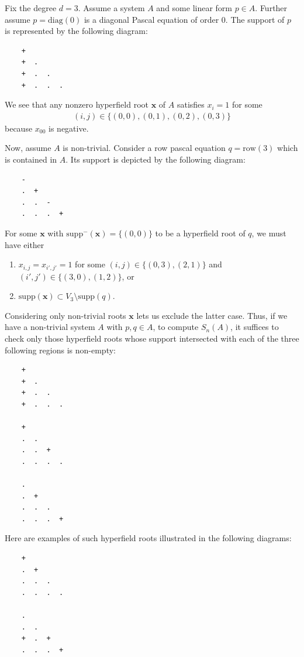 \begin{example}
Fix the degree $d = 3$.
Assume a system $A$ and some linear form $p \in A$. Further assume $p = \mathrm{diag}(0)$ is a diagonal Pascal equation of order $0$. The support of $p$ is represented by the following diagram:
\begin{verbatim}
    + 
    +  . 
    +  .  .
    +  .  .  .
\end{verbatim} 
We see that any nonzero hyperfield root $\mathbf{x}$ of $A$ satisfies $x_{i} = 1$ for some 
\begin{align*}
    (i,j) \in \{ (0,0), (0,1), (0,2), (0,3) \}
\end{align*}
because $x_{00}$ is negative.

Now, assume $A$ is non-trivial. Consider a row pascal equation $q = \mathrm{row}(3)$ which is contained in \( A \). Its support is depicted by the following diagram:
\begin{verbatim}
    - 
    .  + 
    .  .  -
    .  .  .  +
\end{verbatim} 
For some $\mathbf{x}$ with $\mathrm{supp}^-(\mathbf{x}) = \{ (0,0) \}$ to be a hyperfield root of $q$, we must have either
\begin{enumerate}
\item $x_{i,j} = x_{i',j'} = 1$ for some $(i,j) \in \{ (0,3), (2, 1) \}$ and $(i',j') \in \{ (3,0), (1,2) \}$, or 
\item $\mathrm{supp}(\mathbf{x}) \subset V_{3} \setminus \mathrm{supp}(q)$.
\end{enumerate}
Considering only non-trivial roots $\mathbf{x}$ lets us exclude the latter case. Thus, if we have a non-trivial system $A$ with $p,q \in A$, to compute $S_{n}(A)$, it suffices to check only those hyperfield roots whose support intersected with each of the three following regions is non-empty:
\begin{verbatim}
    + 
    +  . 
    +  .  .
    +  .  .  .

    + 
    .  . 
    .  .  +
    .  .  .  .

    . 
    .  + 
    .  .  .
    .  .  .  + 
\end{verbatim}
Here are examples of such hyperfield roots illustrated in the following diagrams:
\begin{verbatim}
    +               
    .  +           
    .  .  .
    .  .  .  .

    . 
    .  . 
    +  .  +
    .  .  .  +
\end{verbatim}
\end{example}

